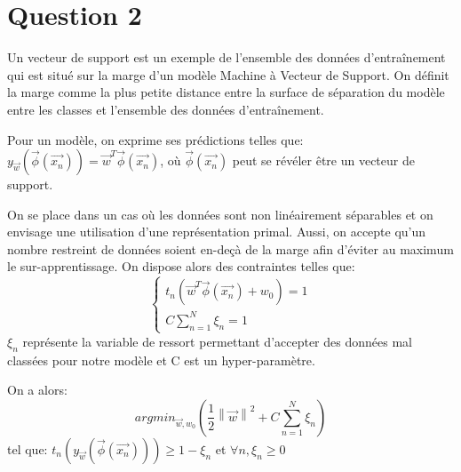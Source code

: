 \section{Question 2}
Un vecteur de support est un exemple de l'ensemble des données d'entraînement qui est situé sur la marge d'un modèle Machine à Vecteur de Support. On définit la marge comme la plus petite distance entre la surface de séparation du modèle entre les classes et l'ensemble des données d'entraînement. 

Pour un modèle, on exprime ses prédictions telles que: $y_{\overrightarrow{w}}(\overrightarrow{\phi}(\overrightarrow{x_n})) = \overrightarrow{w}^T \overrightarrow{\phi}(\overrightarrow{x_n})$, où $\overrightarrow{\phi}(\overrightarrow{x_n})$ peut se révéler être un vecteur de support.

On se place dans un cas où les données sont non linéairement séparables et on envisage une utilisation d'une représentation primal. Aussi, on accepte qu'un nombre restreint de données soient en-deçà de la marge afin d'éviter au maximum le sur-apprentissage.
On dispose alors des contraintes telles que:
\begin{equation}
\begin{cases}
      t_n\left(\overrightarrow{w}^T \overrightarrow{\phi}(\overrightarrow{x_n}) + w_0\right) = 1 \\
      C \sum_{n=1}^N \xi_n = 1
\end{cases}       
\end{equation}
$\xi_n$ représente la variable de ressort permettant d'accepter des données mal classées pour notre modèle et C est un hyper-paramètre.

On a alors:
\begin{equation}
	argmin_{\overrightarrow{w}, w_0} \left(\frac{1}{2} \left\lVert\overrightarrow{w}\right\rVert^2 + C \sum_{n=1}^N \xi_n \right)
    \label{eq:fin_develop_1}
\end{equation}
tel que: $t_n\left(y_{\overrightarrow{w}}(\overrightarrow{\phi}(\overrightarrow{x_n}))\right) \geqslant 1 - \xi_n $ et $\forall n, \xi_n \geqslant 0 $

